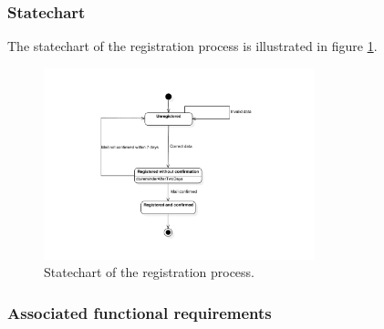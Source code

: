 \subsubsection{Statechart}
The statechart of the registration process is illustrated in figure \ref{fig:statechart-registration}.
\begin{figure}
\begin{center}
\includegraphics[width=0.7\textwidth]{diagrams/statechart_registration.pdf}
\caption{Statechart of the registration process.}
\label{fig:statechart-registration}
\end{center}
\end{figure}

\subsubsection{Associated functional requirements}


